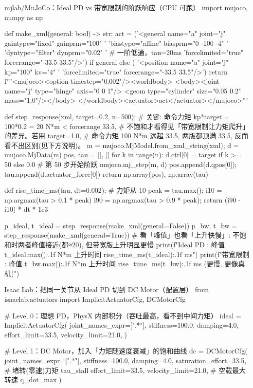 \begin{codebox}[Python]{mjlab/MuJoCo：Ideal PD vs 带宽限制的阶跃响应（CPU 可跑）}
import mujoco, numpy as np

def make_xml(general: bool) -> str:
    act = ('<general name="a" joint="j" gaintype="fixed" gainprm="100" '
           'biastype="affine" biasprm="0 -100 -4" '
           'dyntype="filter" dynprm="0.02" '          # 一阶低通，tau=20ms
           'forcelimited="true" forcerange="-33.5 33.5"/>') if general else (
           '<position name="a" joint="j" kp="100" kv="4" '
           'forcelimited="true" forcerange="-33.5 33.5"/>')
    return f'''<mujoco><option timestep="0.002"/><worldbody>
      <body><joint name="j" type="hinge" axis="0 0 1"/>
      <geom type="cylinder" size="0.05 0.2" mass="1.0"/></body>
      </worldbody><actuator>{act}</actuator></mujoco>'''

def step_response(xml, target=0.2, n=500):
    # 关键: 命令力矩 kp*target = 100*0.2 = 20 N*m < forcerange 33.5,
    # 不饱和才看得见「带宽限制让力矩爬升」的差异。若用 target=1.0,
    # 命令力矩 100 N*m 远超 33.5, 两版都顶满 33.5, 反而看不出区别(见下方说明)。
    m = mujoco.MjModel.from_xml_string(xml); d = mujoco.MjData(m)
    pos, tau = [], []
    for k in range(n):
        d.ctrl[0] = target if k >= 50 else 0.0   # 第 50 步开始阶跃
        mujoco.mj_step(m, d)
        pos.append(d.qpos[0]); tau.append(d.actuator_force[0])
    return np.array(pos), np.array(tau)

def rise_time_ms(tau, dt=0.002):           # 力矩从 10%
    peak = tau.max(); i10 = np.argmax(tau > 0.1 * peak)
    i90 = np.argmax(tau > 0.9 * peak); return (i90 - i10) * dt * 1e3

p_ideal, t_ideal = step_response(make_xml(general=False))
p_bw,    t_bw    = step_response(make_xml(general=True))
# 看「峰值」也看「上升快慢」: 不饱和时两者峰值接近(都≈20), 但带宽版上升明显更慢
print(f"Ideal PD : 峰值 {t_ideal.max():.1f} N*m  上升时间 {rise_time_ms(t_ideal):.1f} ms")
print(f"带宽限制 : 峰值 {t_bw.max():.1f} N*m  上升时间 {rise_time_ms(t_bw):.1f} ms (更慢, 更像真机)")
\end{codebox}

\begin{codebox}[Python]{Isaac Lab：把同一关节从 Ideal PD 切到 DC Motor（配置层）}
from isaaclab.actuators import ImplicitActuatorCfg, DCMotorCfg

# Level 0：理想 PD，PhysX 内部积分（吞吐最高，看不到中间力矩）
ideal = ImplicitActuatorCfg(
    joint_names_expr=[".*"], stiffness=100.0, damping=4.0,
    effort_limit=33.5, velocity_limit=21.0,
)

# Level 1：DC Motor，加入「力矩随速度衰减」的饱和曲线
dc = DCMotorCfg(
    joint_names_expr=[".*"], stiffness=100.0, damping=4.0,
    saturation_effort=33.5,   # 堵转(零速)力矩 tau_stall
    effort_limit=33.5, velocity_limit=21.0,   # 空载最大转速 q_dot_max
)
\end{codebox}

